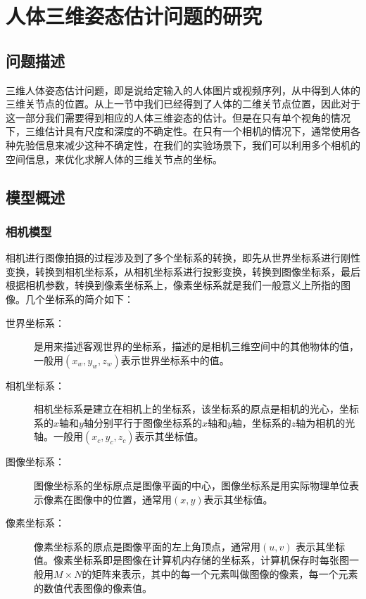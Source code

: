 

\newcommand{\qczb}{齐次坐标}
\section{人体三维姿态估计问题的研究}
\subsection{问题描述}
三维人体姿态估计问题，即是说给定输入的人体图片或视频序列，从中得到人体的三维关节点的位置。从上一节中我们已经得到了人体的二维关节点位置，因此对于这一部分我们需要得到相应的人体三维姿态的估计。但是在只有单个视角的情况下，三维估计具有尺度和深度的不确定性。在只有一个相机的情况下，通常使用各种先验信息来减少这种不确定性，在我们的实验场景下，我们可以利用多个相机的空间信息，来优化求解人体的三维关节点的坐标。

\subsection{模型概述}
\subsubsection{相机模型}
相机进行图像拍摄的过程涉及到了多个坐标系的转换，即先从世界坐标系进行刚性变换，转换到相机坐标系，从相机坐标系进行投影变换，转换到图像坐标系，最后根据相机参数，转换到像素坐标系上，像素坐标系就是我们一般意义上所指的图像。几个坐标系的简介如下：
\begin{description}
    \item[世界坐标系：] 是用来描述客观世界的坐标系，描述的是相机三维空间中的其他物体的值，一般用\((x_w, y_w, z_w)\)表示世界坐标系中的值。
    \item[相机坐标系：] 相机坐标系是建立在相机上的坐标系，该坐标系的原点是相机的光心，坐标系的\(x\)轴和\(y\)轴分别平行于图像坐标系的\(x\)轴和\(y\)轴，坐标系的\(z\)轴为相机的光轴。一般用\((x_c,y_c,z_c)\)表示其坐标值。
    \item[图像坐标系：] 图像坐标系的坐标原点是图像平面的中心，图像坐标系是用实际物理单位表示像素在图像中的位置，通常用\((x,y)\)表示其坐标值。
    \item[像素坐标系：] 像素坐标系的原点是图像平面的左上角顶点，通常用\((u,v)\) 表示其坐标值。像素坐标系即是图像在计算机内存储的坐标系，计算机保存时每张图一般用\(M\times N\)的矩阵来表示，其中的每一个元素叫做图像的像素，每一个元素的数值代表图像的像素值。
\end{description}

